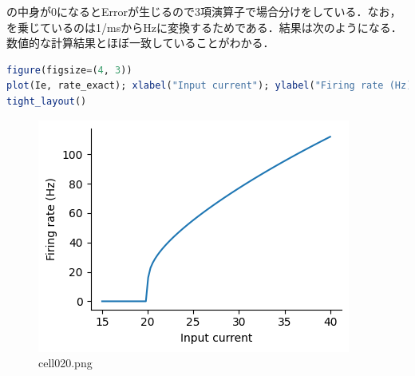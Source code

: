 の中身が0になるとErrorが生じるので3項演算子で場合分けをしている．なお，を乗じているのは1/msからHzに変換するためである．結果は次のようになる．数値的な計算結果とほぼ一致していることがわかる．
\begin{lstlisting}[language=julia]
figure(figsize=(4, 3))
plot(Ie, rate_exact); xlabel("Input current"); ylabel("Firing rate (Hz)")
tight_layout()
\end{lstlisting}
\begin{figure}[ht]
	\centering
	\includegraphics[scale=0.8, max width=\linewidth]{./fig/neuron-model/lif/cell020.png}
	\caption{cell020.png}
	\label{cell020.png}
\end{figure}

